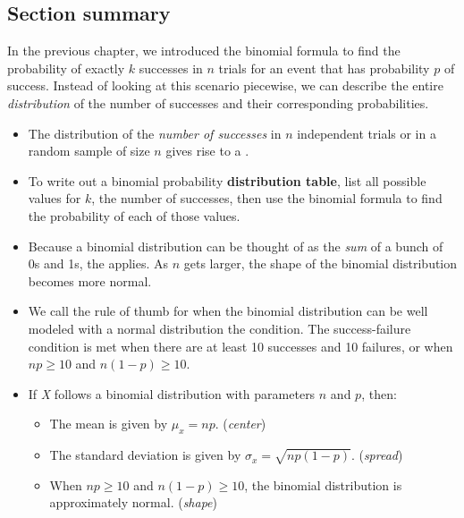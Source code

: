 
\subsection*{Section summary}

\noindent In the previous chapter, we introduced the binomial formula to find the probability of exactly $k$ successes in $n$ trials for an event that has probability $p$ of success.  Instead of looking at this scenario piecewise, we can describe the entire \textit{distribution} of the number of successes and their corresponding probabilities.  
\begin{itemize}
\item The distribution of the \textit{number of successes} in $n$ independent trials or in a random sample of size $n$ gives rise to a .  

\item To write out a binomial probability \textbf{distribution table}, list all possible values for $k$, the number of successes, then use the binomial formula to find the probability of each of those values.  

\item Because a binomial distribution can be thought of as the \emph{sum} of a bunch of 0s and 1s, the  applies.  As $n$ gets larger, the shape of the binomial distribution becomes more normal.  

\item  We call the rule of thumb for when the binomial distribution can be well modeled with a normal distribution the  condition.  The success-failure condition is met when there are at least 10 successes and 10 failures, or when $np\ge 10$ and $n(1-p)\ge 10$.

\item If \textit{X} follows a binomial distribution with parameters $n$ and $p$, then:
\begin{itemize}\vspace{-1mm}
\setlength{\itemsep}{0mm}
\item The mean is given by $\mu_x = np$. \quad (\emph{center})
\item The standard deviation is given by $\sigma_x = \sqrt{np(1-p)}$. \quad (\emph{spread})
\item When $np\ge 10$ and $n(1-p)\ge 10$, the binomial distribution is approximately normal.  \quad (\emph{shape})
\end{itemize}


\end{itemize}
